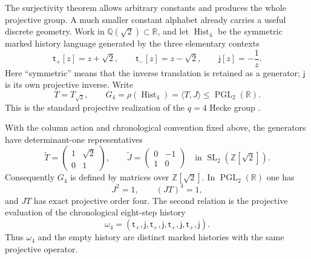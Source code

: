 The surjectivity theorem allows arbitrary constants and produces the whole
projective group.  A much smaller constant alphabet already carries a useful
discrete geometry.  Work in
\(\mathbb Q(\sqrt2)\subset\mathbb R\), and let
\(\operatorname{Hist}_4\) be the symmetric marked history language generated
by the three elementary contexts
\[
  \mathsf t_+[z]=z+\sqrt2,
  \qquad
  \mathsf t_-[z]=z-\sqrt2,
  \qquad
  \mathsf j[z]=-\frac1z.
\]
Here ``symmetric'' means that the inverse translation is retained as a
generator; \(\mathsf j\) is its own projective inverse.  Write
\[
  T=T_{\sqrt2},
  \qquad
  G_4=\rho(\operatorname{Hist}_4)
      =\langle T,J\rangle
      \leq \operatorname{PGL}_2(\mathbb R).
\]
This is the standard projective realization of the $q=4$ Hecke group
\cite{Rosen1954ContinuedFractions,LangLang2016HeckeGroups}.

\begin{proposition}
\label{prop:hecke-four-arithmetic-relation}
With the column action and chronological convention fixed above, the generators
have determinant-one representatives
\[
  \widetilde T=
  \begin{pmatrix}1&\sqrt2\\0&1\end{pmatrix},
  \qquad
  \widetilde J=
  \begin{pmatrix}0&-1\\1&0\end{pmatrix}
  \quad\text{in }\operatorname{SL}_2(\mathbb Z[\sqrt2]).
\]
Consequently $G_4$ is defined by matrices over $\mathbb Z[\sqrt2]$.  In
$\operatorname{PGL}_2(\mathbb R)$ one has
\begin{equation}
  J^2=1,
  \qquad
  (JT)^4=1,
  \label{eq:hecke-four-relations}
\end{equation}
and $JT$ has exact projective order four.  The second relation is the
projective evaluation of the chronological eight-step history
\begin{equation}
  \omega_4=(\mathsf t_+,\mathsf j,
             \mathsf t_+,\mathsf j,
             \mathsf t_+,\mathsf j,
             \mathsf t_+,\mathsf j).
  \label{eq:hecke-four-history}
\end{equation}
Thus $\omega_4$ and the empty history are distinct marked histories with the
same projective operator.
\end{proposition}

